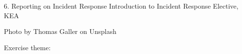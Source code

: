 \documentclass[Screen16to9,17pt]{foils}
\begin{document}
\mytitlepage
{6. Reporting on Incident Response}
{Introduction to Incident Response Elective, KEA}




\begin{list2}
\item
\item
\item
\end{list2}

Photo by Thomas Galler on Unsplash


\begin{list2}
\item
\item
\item
\item
\item
\end{list2}

Exercise theme:
\begin{list2}
\item
\item
\item
\end{list2}


\end{document}
